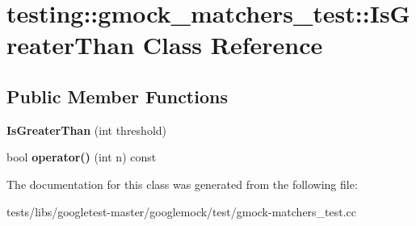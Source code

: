 \hypertarget{classtesting_1_1gmock__matchers__test_1_1IsGreaterThan}{}\section{testing\+:\+:gmock\+\_\+matchers\+\_\+test\+:\+:Is\+Greater\+Than Class Reference}
\label{classtesting_1_1gmock__matchers__test_1_1IsGreaterThan}
\subsection*{Public Member Functions}
\begin{DoxyCompactItemize}
\item 
\mbox{\label{classtesting_1_1gmock__matchers__test_1_1IsGreaterThan_a6682979fb1ed5511995e575954d07aaf}} 
{\bfseries Is\+Greater\+Than} (int threshold)
\item 
\mbox{\label{classtesting_1_1gmock__matchers__test_1_1IsGreaterThan_a34b455148a2d299c654bc4443db0af67}} 
bool {\bfseries operator()} (int n) const
\end{DoxyCompactItemize}


The documentation for this class was generated from the following file\+:\begin{DoxyCompactItemize}
\item 
tests/libs/googletest-\/master/googlemock/test/gmock-\/matchers\+\_\+test.\+cc\end{DoxyCompactItemize}
